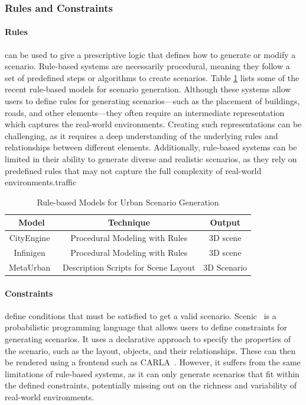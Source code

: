 \documentclass{article}
\begin{document}
\subsubsection{Rules and Constraints}

\paragraph{Rules} can be used to give a prescriptive logic that defines how to generate or modify a scenario. Rule-based systems are necessarily procedural, meaning they follow a set of predefined steps or algorithms to create scenarios. Table \ref{tab:rule_based_models} lists some of the recent rule-based models for scenario generation. Although these systems allow users to define rules for generating scenarios—such as the placement of buildings, roads, and other elements—they often require an intermediate representation which captures the real-world environments. Creating such representations can be challenging, as it requires a deep understanding of the underlying rules and relationships between different elements. Additionally, rule-based systems can be limited in their ability to generate diverse and realistic scenarios, as they rely on predefined rules that may not capture the full complexity of real-world environments.traffic

\begin{table}[ht]
\centering
    \begin{tabular}{|c|c|c|}
    \hline
    \textbf{Model} & \textbf{Technique} & \textbf{Output} \\ \hline
    CityEngine~\cite{parish2001procedural} & Procedural Modeling with Rules & 3D scene \\ \hline
    Infinigen~\cite{raistrick2023infinite} & Procedural Modeling with Rules & 3D scene \\ \hline
    MetaUrban~\cite{wu2024metaurban} & Description Scripts for Scene Layout & 3D Scenario \\ \hline    
    \end{tabular}
\caption{Rule-based Models for Urban Scenario Generation}
\label{tab:rule_based_models}
\end{table}

\paragraph{Constraints} define conditions that must be satisfied to get a valid scenario. Scenic~\cite{fremont2019scenic} is a probabilistic programming language that allows users to define constraints for generating scenarios. It uses a declarative approach to specify the properties of the scenario, such as the layout, objects, and their relationships. These can then be rendered using a frontend such as CARLA~\cite{dosovitskiy2017carla}. However, it suffers from the same limitations of rule-based systems, as it can only generate scenarios that fit within the defined constraints, potentially missing out on the richness and variability of real-world environments.
\end{document}
